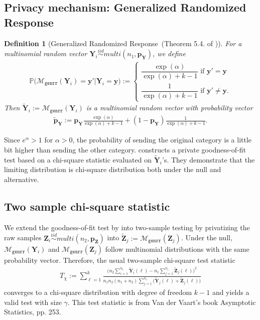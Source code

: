 \documentclass[11pt]{article} %
\newcommand{\vecBold}[1]{\boldsymbol{#1}} %
\newcommand{\sampleSize}{n}
\newcommand{\distparamMultinom}{\boldsymbol{p}}
\newcommand{\mP}{\mathbb{P}} %
\newcommand{\alphabetSize}{k}
\newcommand{\genrr}{\mathcal{M}_{\texttt{genrr}}}
\newcommand{\rvY}{Y}
\newcommand{\rVecY}{\vecBold{\rvY}}
\newcommand{\rvZ}{Z}
\newcommand{\rVecZ}{\vecBold{\rvZ}}
\newtheorem{definition}{Definition}[section]
\begin{document}
\subsection{Privacy mechanism: Generalized Randomized Response}
\begin{definition}[Generalized Randomized Response~(Theorem 5.4. of \citet{Gaboardi2018LDPChisq})]
For a multinomial random vector 
$
\rVecY_i \stackrel{iid}{\sim}multi(\sampleSize_1, \distparamMultinom_{\rVecY})$, 
we define
\begin{align*}
\mP
\bigl(
\genrr(\rVecY_i) = \vecBold{y}'
|
\rVecY_i = \vecBold{y}
\bigr)
:=
\begin{cases}
\dfrac
	{\exp(\alpha)}
	{\exp(\alpha) + \alphabetSize - 1 }
	\text{ if }
	\vecBold{y}' = \vecBold{y}
	\\
\dfrac
	{1}
	{\exp(\alpha) + \alphabetSize - 1 }	
	\text{ if }
	\vecBold{y}' \neq \vecBold{y}.
\end{cases}
\end{align*}
Then  $\tilde{\rVecY}_i:=\genrr(\rVecY_i)$ is a multinomial random vector with probability vector
\begin{align*}
\tilde{\distparamMultinom}_{\rVecY}
:=
\distparamMultinom_{\rVecY}
	\frac
	{\exp(\alpha)}
	{\exp(\alpha) + \alphabetSize - 1 }
	+
(1-\distparamMultinom_{\rVecY})	
	\frac
	{1}
	{\exp(\alpha) + \alphabetSize - 1 }.
\end{align*}
\end{definition}
\noindent
Since $e^\alpha>1$ for $\alpha>0$, the probability of sending the original category is a little bit higher than sending the other category.
\citet{Gaboardi2018LDPChisq} constructs a private goodness-of-fit test based on a chi-square statistic evaluated on $\tilde{\rVecY}_i$'s.
They demonstrate that the limiting distribution is chi-square distribution both under the null and alternative.



\subsection{Two sample chi-square statistic}
We extend the goodness-of-fit test by \citet{Gaboardi2018LDPChisq} into two-sample testing by privatizing the raw samples
$\rVecZ_i \stackrel{iid}{\sim}multi(\sampleSize_2, \distparamMultinom_{\rVecZ})$
into $\tilde{\rVecZ}_j := \genrr(\rVecZ_j)$. 
Under the null, $\genrr(\rVecY_i)$ and $\genrr(\rVecZ_j)$ follow multinomial distributions with the same probability vector.
 Therefore, the usual two-sample chi-square test statistic
 	\begin{align*}
		T_{\chi} :=
		\sum_{\ell=1}^k
		\frac{
		\bigl(
		n_2
		\sum_{i=1}^{n_1}\tilde{\rVecY}_i(\ell)
		-
		n_1
		\sum_{j=1}^{n_1}\tilde{\rVecZ}_j(\ell)
		\bigr)^2
		}{
		n_1 n_2 (n_1 + n_2) 
		\sum_{j=1}^{n_1}
		\bigl(
		\tilde{\rVecY}_j(\ell)+\tilde{\rVecZ}_j(\ell)
		\bigr)
		}
	\end{align*}
  converges to a chi-square distribution with degree of freedom $\alphabetSize-1$ and yields a valid  test with size $\gamma$.
This test statistic is from Van der Vaart's book Asymptotic Statistics, pp. 253.
\end{document}

